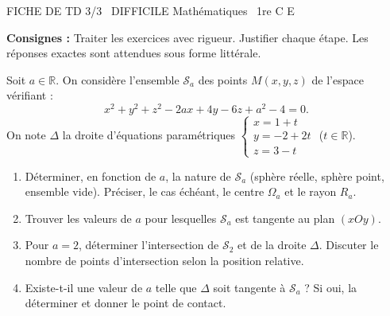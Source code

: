 \documentclass[11pt]{article}
\begin{document}
\begin{tcolorbox}[enhanced,colback=popink,colframe=popink,arc=10pt,boxrule=0pt,left=12pt,right=12pt,top=9pt,bottom=9pt]
{\color{white}\popxbold\small FICHE DE TD 3/3 \textbullet\ DIFFICILE \hfill Mathématiques \textbullet\ 1re C E\par}
\end{tcolorbox}
\vspace{4pt}
\noindent\textbf{Consignes :} Traiter les exercices avec rigueur. Justifier chaque étape. Les réponses exactes sont attendues sous forme littérale.

\begin{exercice}
Soit $a \in \mathbb{R}$. On considère l'ensemble $\mathcal{S}_a$ des points $M(x,y,z)$ de l'espace vérifiant :
\[
x^2 + y^2 + z^2 - 2ax + 4y - 6z + a^2 - 4 = 0.
\]
On note $\Delta$ la droite d'équations paramétriques $\begin{cases} x = 1 + t \\ y = -2 + 2t \\ z = 3 - t \end{cases}$ ($t \in \mathbb{R}$).
\begin{enumerate}
    \item Déterminer, en fonction de $a$, la nature de $\mathcal{S}_a$ (sphère réelle, sphère point, ensemble vide). Préciser, le cas échéant, le centre $\Omega_a$ et le rayon $R_a$.
    \item Trouver les valeurs de $a$ pour lesquelles $\mathcal{S}_a$ est tangente au plan $(xOy)$.
    \item Pour $a = 2$, déterminer l'intersection de $\mathcal{S}_2$ et de la droite $\Delta$. Discuter le nombre de points d'intersection selon la position relative.
    \item Existe-t-il une valeur de $a$ telle que $\Delta$ soit tangente à $\mathcal{S}_a$ ? Si oui, la déterminer et donner le point de contact.
\end{enumerate}
\end{exercice}
\end{document}
